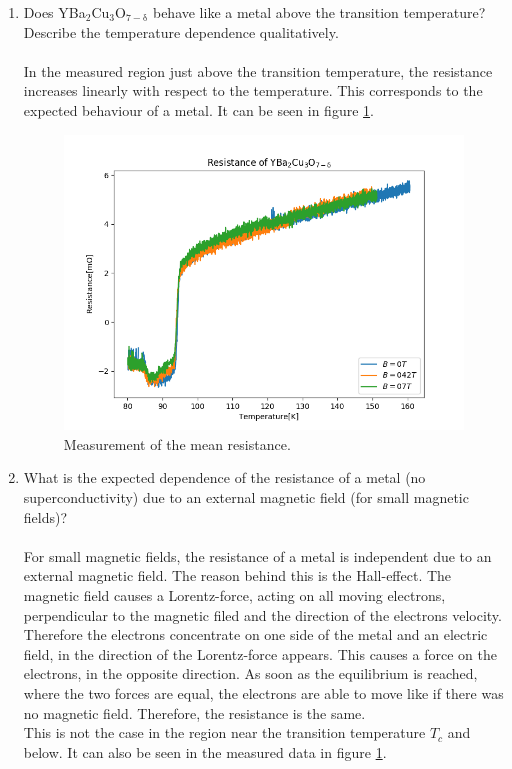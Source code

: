 \documentclass[a4paper,parskip,11pt, DIV12]{scrreprt}
\begin{document}
\begin{enumerate}

\item Does YBa$_2$Cu$_3$O$_{7-\mathrm{\delta}}$  behave like a metal above the transition temperature? Describe the temperature dependence qualitatively.\\
\\
In the measured region just above the transition temperature, the resistance increases linearly with respect to the temperature. This corresponds to the expected behaviour of a metal. It can be seen in figure \ref{Res}.

\begin{figure}[H]
\centering
\includegraphics[scale=0.5]{Widerstand}
\caption[]{Measurement of the mean resistance.}
\label{Res}
\end{figure}
\hspace{0.1pt}

\item What is the expected dependence of the resistance of a metal (no superconductivity) due to an external magnetic field (for small magnetic fields)?\\
\\
For small magnetic fields, the resistance of a metal is independent due to an external magnetic field. The reason behind this is the Hall-effect. The magnetic field causes a Lorentz-force, acting on all moving electrons, perpendicular to the magnetic filed and the direction of the electrons velocity. Therefore the electrons concentrate on one side of the metal and an electric field, in the direction of the Lorentz-force appears. This causes a force on the electrons, in the opposite direction. As soon as the equilibrium is reached, where the two forces are equal, the electrons are able to move like if there was no magnetic field. Therefore, the resistance is the same. \\
This is not the case in the region near the transition temperature $T_c$ and below. It can also be seen in the measured data in figure \ref{Res}.


\end{enumerate}
\end{document}
